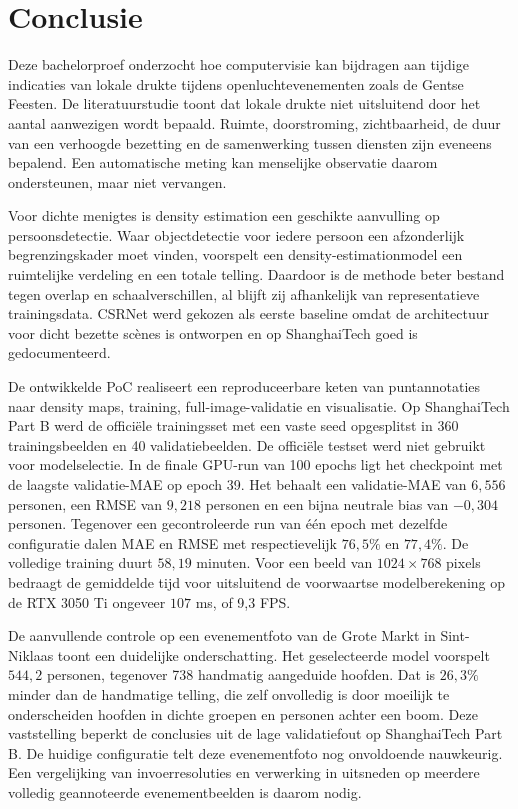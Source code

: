 
\chapter{Conclusie}%
\label{ch:conclusie}

Deze bachelorproef onderzocht hoe computervisie kan bijdragen aan tijdige indicaties van lokale drukte tijdens openluchtevenementen zoals de Gentse Feesten. De literatuurstudie toont dat lokale drukte niet uitsluitend door het aantal aanwezigen wordt bepaald. Ruimte, doorstroming, zichtbaarheid, de duur van een verhoogde bezetting en de samenwerking tussen diensten zijn eveneens bepalend. Een automatische meting kan menselijke observatie daarom ondersteunen, maar niet vervangen.

Voor dichte menigtes is density estimation een geschikte aanvulling op persoonsdetectie. Waar objectdetectie voor iedere persoon een afzonderlijk begrenzingskader moet vinden, voorspelt een density-estimationmodel een ruimtelijke verdeling en een totale telling. Daardoor is de methode beter bestand tegen overlap en schaalverschillen, al blijft zij afhankelijk van representatieve trainingsdata. CSRNet werd gekozen als eerste baseline omdat de architectuur voor dicht bezette scènes is ontworpen en op ShanghaiTech goed is gedocumenteerd.

De ontwikkelde PoC realiseert een reproduceerbare keten van puntannotaties naar density maps, training, full-image-validatie en visualisatie. Op ShanghaiTech Part B werd de officiële trainingsset met een vaste seed opgesplitst in 360 trainingsbeelden en 40 validatiebeelden. De officiële testset werd niet gebruikt voor modelselectie. In de finale GPU-run van 100 epochs ligt het checkpoint met de laagste validatie-MAE op epoch 39. Het behaalt een validatie-MAE van \(6{,}556\) personen, een RMSE van \(9{,}218\) personen en een bijna neutrale bias van \(-0{,}304\) personen. Tegenover een gecontroleerde run van één epoch met dezelfde configuratie dalen MAE en RMSE met respectievelijk \(76{,}5\%\) en \(77{,}4\%\). De volledige training duurt \(58{,}19\) minuten. Voor een beeld van \(1024 \times 768\) pixels bedraagt de gemiddelde tijd voor uitsluitend de voorwaartse modelberekening op de RTX 3050 Ti ongeveer \(107\) ms, of 9,3 FPS.

De aanvullende controle op een evenementfoto van de Grote Markt in Sint-Niklaas toont een duidelijke onderschatting. Het geselecteerde model voorspelt \(544{,}2\) personen, tegenover 738 handmatig aangeduide hoofden. Dat is \(26{,}3\%\) minder dan de handmatige telling, die zelf onvolledig is door moeilijk te onderscheiden hoofden in dichte groepen en personen achter een boom. Deze vaststelling beperkt de conclusies uit de lage validatiefout op ShanghaiTech Part B. De huidige configuratie telt deze evenementfoto nog onvoldoende nauwkeurig. Een vergelijking van invoerresoluties en verwerking in uitsneden op meerdere volledig geannoteerde evenementbeelden is daarom nodig.

